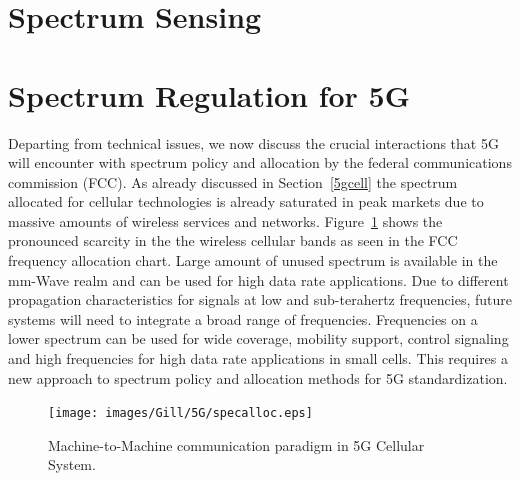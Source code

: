 \section{Spectrum Sensing}

\section{Spectrum Regulation for 5G}

Departing from technical issues, we now discuss the crucial interactions that 5G will encounter with spectrum policy and allocation by the federal communications commission (FCC). As already discussed in Section~\ref{5gcell} the spectrum allocated for cellular technologies is already saturated in peak markets due to massive amounts of wireless services and networks. Figure~\ref{specalloc} shows the pronounced scarcity in the the wireless cellular bands as seen in the FCC frequency allocation chart. Large amount of unused spectrum is available in the mm-Wave realm and can be used for high data rate applications. Due to different propagation characteristics for signals at low and sub-terahertz frequencies, future systems will need to integrate a broad range of frequencies. Frequencies on a lower spectrum can be used for wide coverage, mobility support, control signaling and high frequencies for high data rate applications in small cells. This requires a new approach to spectrum policy and allocation methods for 5G standardization.

\begin{figure}[!ht]
	\centering
\texttt{[image: images/Gill/5G/specalloc.eps]}
	\caption{Machine-to-Machine communication paradigm in 5G Cellular System.}
	\label{specalloc}
\end{figure}

